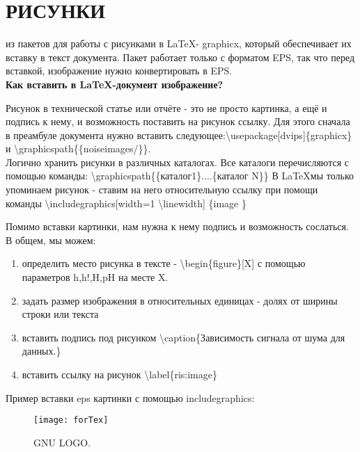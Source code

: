 \documentclass[a4paper,14pt,russian]{extreport}
\begin{document}

\chapter{РИСУНКИ}

 из пакетов для работы с рисунками в \LaTeX - graphicx, который обеспечивает их вставку в текст документа. Пакет работает только с форматом EPS, так что перед вставкой, изображение нужно конвертировать в EPS. \\
\textbf{Как вставить в LaTeX-документ изображение?}\\
\par Рисунок в технической статье или отчёте - это не просто картинка, а ещё и подпись к нему, и возможность поставить на рисунок ссылку. Для этого сначала в преамбуле документа нужно вставить следующее:\textbackslash usepackage[dvips]\{graphicx\} и \textbackslash graphicspath\{\{noiseimages/\}\}. \\
Логично хранить рисунки в различных каталогах. Все каталоги перечисляются с помощью команды: \textbackslash graphicspath\{\{каталог1\}....\{каталог N\}\}
В \LaTeX мы только упоминаем рисунок - ставим на него относительную ссылку при помощи команды \textbackslash includegraphics[width=1 \textbackslash linewidth] \{image \} 

\par Помимо вставки картинки, нам нужна к нему подпись и возможность сослаться. В общем, мы можем:
\begin{enumerate}

\renewcommand{\theenumi}{1}
\item определить место рисунка в тексте - \textbackslash begin\{figure\}[X] с помощью параметров h,h!,H,pH на месте X.

\renewcommand{\theenumi}{2}
\item задать размер изображения в относительных единицах - долях от ширины строки или текста

\renewcommand{\theenumi}{3}
\item  вставить подпись под рисунком \textbackslash caption\{Зависимость сигнала от шума для данных.\}

\renewcommand{\theenumi}{4}
\item вставить ссылку на рисунок \textbackslash label\{ris:image\}
\end{enumerate}

Пример вставки eps картинки с помощью includegraphics: 
\begin{figure}[h]
\texttt{[image: forTex]}
\caption{GNU LOGO.}
\label{ris:image}
\end{figure}
\newpage
\end{document}
